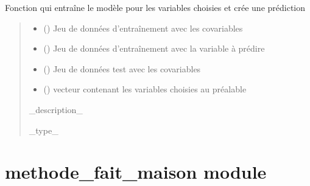 \documentclass[letterpaper,10pt,french]{sphinxmanual}
\begin{document}

\begin{fulllineitems}
\label{\detokenize{KNN_sel_var:KNN_sel_var.train}}
\pysigstartsignatures
{}
\pysigstopsignatures
\sphinxAtStartPar
Fonction qui entraîne le modèle pour les variables choisies et crée une prédiction
\begin{quote}\begin{description}
\begin{itemize}
\item {} 
\sphinxAtStartPar
{} () \textendash{} Jeu de données d’entraînement avec les co\sphinxhyphen{}variables

\item {} 
\sphinxAtStartPar
{} () \textendash{} Jeu de données d’entraînement avec la variable à prédire

\item {} 
\sphinxAtStartPar
{} () \textendash{} Jeu de données test avec les co\sphinxhyphen{}variables

\item {} 
\sphinxAtStartPar
{} () \textendash{} vecteur contenant les variables choisies au préalable

\end{itemize}

\sphinxAtStartPar
\_description\_

\sphinxAtStartPar
\_type\_

\end{description}\end{quote}

\end{fulllineitems}


\sphinxstepscope


\chapter{methode\_fait\_maison module}
\label{\detokenize{methode_fait_maison:module-methode_fait_maison}}\label{\detokenize{methode_fait_maison:methode-fait-maison-module}}\label{\detokenize{methode_fait_maison::doc}}
\end{document}
